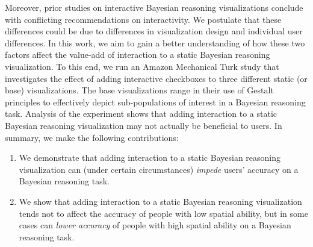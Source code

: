 Moreover, prior studies on interactive Bayesian reasoning visualizations conclude with conflicting recommendations on interactivity\cite{tsai2011Interactive, khan2018Interactive}. We postulate that these differences could be due to differences in visualization design and individual user differences.
In this work, we aim to gain a better understanding of how these two factors affect the value-add of interaction to a static Bayesian reasoning visualization. To this end, we run an Amazon Mechanical Turk study that investigates the effect of adding interactive checkboxes to three different static (or base) visualizations. The base visualizations range in their use of Gestalt principles to effectively depict sub-populations of interest in a Bayesian reasoning task. Analysis of the experiment shows that adding interaction to a static Bayesian reasoning visualization may not actually be beneficial to users.  
In summary, we make the following contributions: 
\begin{enumerate}
	\item We demonstrate that adding interaction to a static Bayesian reasoning visualization can (under certain circumstances) \textit{impede} users' accuracy on a Bayesian reasoning task.  
	\item We show that adding interaction to a static Bayesian reasoning visualization tends not to affect the accuracy of people with low spatial ability, but in some cases can \textit{lower accuracy} of people with high spatial ability on a Bayesian reasoning task. 
\end{enumerate}

   
